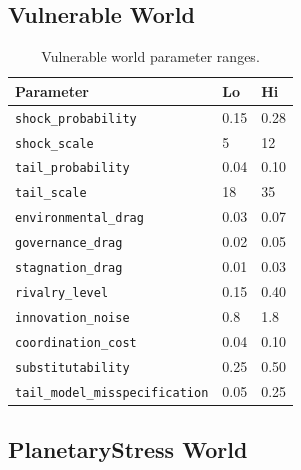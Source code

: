 \subsection{Vulnerable World}

\begin{table}[ht]
\centering
\small
\begin{tabularx}{\linewidth}{Xll}
\toprule
\textbf{Parameter} & \textbf{Lo} & \textbf{Hi} \\
\midrule
\texttt{shock\_probability} & 0.15 & 0.28 \\
\texttt{shock\_scale} & 5 & 12 \\
\texttt{tail\_probability} & 0.04 & 0.10 \\
\texttt{tail\_scale} & 18 & 35 \\
\texttt{environmental\_drag} & 0.03 & 0.07 \\
\texttt{governance\_drag} & 0.02 & 0.05 \\
\texttt{stagnation\_drag} & 0.01 & 0.03 \\
\texttt{rivalry\_level} & 0.15 & 0.40 \\
\texttt{innovation\_noise} & 0.8 & 1.8 \\
\texttt{coordination\_cost} & 0.04 & 0.10 \\
\texttt{substitutability} & 0.25 & 0.50 \\
\texttt{tail\_model\_misspecification} & 0.05 & 0.25 \\
\bottomrule
\end{tabularx}
\caption[Vulnerable world parameters]{Vulnerable world parameter
ranges.}
\label{tab:world-vulnerable}
\end{table}

\subsection{PlanetaryStress World}

